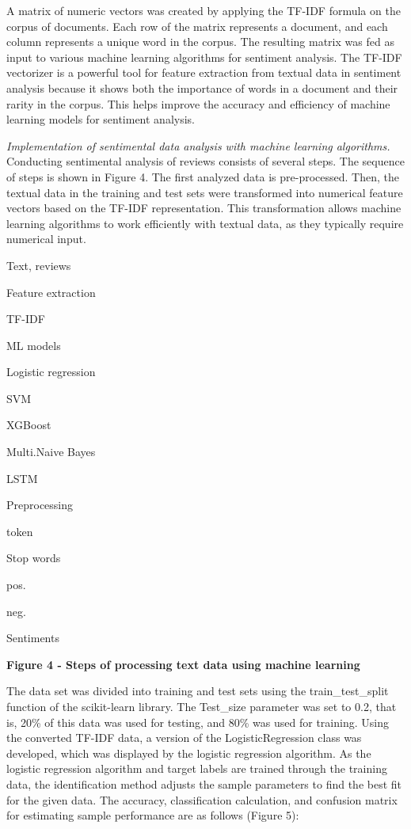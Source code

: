 \begin{multicols}{2}
A matrix of numeric vectors was created by applying the TF-IDF formula
on the corpus of documents. Each row of the matrix represents a
document, and each column represents a unique word in the corpus. The
resulting matrix was fed as input to various machine learning algorithms
for sentiment analysis. The TF-IDF vectorizer is a powerful tool for
feature extraction from textual data in sentiment analysis because it
shows both the importance of words in a document and their rarity in the
corpus. This helps improve the accuracy and efficiency of machine
learning models for sentiment analysis.

\emph{Implementation of sentimental data analysis with machine learning
algorithms.} Conducting sentimental analysis of reviews consists of
several steps. The sequence of steps is shown in Figure 4. The first
analyzed data is pre-processed. Then, the textual data in the training
and test sets were transformed into numerical feature vectors based on
the TF-IDF representation. This transformation allows machine learning
algorithms to work efficiently with textual data, as they typically
require numerical input.
\end{multicols}
Text, reviews

Feature extraction

TF-IDF

ML models

Logistic regression

SVM

XGBoost

Multi.Naive Bayes

LSTM

Preprocessing

token

Stop words

pos.

neg.

Sentiments

{\bfseries Figure 4 - Steps of processing text data using machine learning}

The data set was divided into training and test sets using the
train\_test\_split function of the scikit-learn library. The Test\_size
parameter was set to 0.2, that is, 20\% of this data was used for
testing, and 80\% was used for training. Using the converted TF-IDF
data, a version of the LogisticRegression class was developed, which was
displayed by the logistic regression algorithm. As the logistic
regression algorithm and target labels are trained through the training
data, the identification method adjusts the sample parameters to find
the best fit for the given data. The accuracy, classification
calculation, and confusion matrix for estimating sample performance are
as follows (Figure 5):

